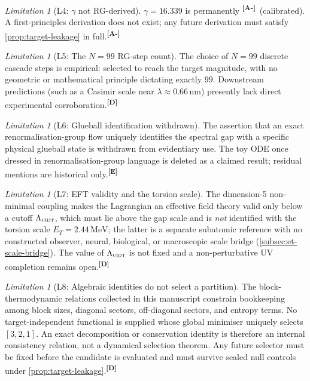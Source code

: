\documentclass[12pt,a4paper,twoside]{article}
\theoremstyle{plain}
\theoremstyle{definition}
\theoremstyle{remark}
\newtheorem{limitation}[theorem]{Limitation}
\newcommand{\UIDT}{\textsc{uidt}} %
\newcommand{\MeV}{\,\mathrm{MeV}}
\newcommand{\catmark}[1]{\textsuperscript{\textsf{\textbf{[#1]}}}}
\newcommand{\GammaGeom}{16.339} %
\newcommand{\ETorsion}{2.44\MeV} %
\begin{document}
\begin{limitation}[L4: $\gamma$ not RG-derived]
\label{lim:L4}
$\gamma = \GammaGeom$ is permanently \catmark{A-}\ (calibrated). A
first-principles derivation does not exist; any future derivation must
satisfy \cref{prop:target-leakage} in full.\catmark{A-}
\end{limitation}

\begin{limitation}[L5: The $N=99$ RG-step count]
\label{lim:L5}
The choice of $N=99$ discrete cascade steps is empirical: selected to
reach the target magnitude, with no geometric or mathematical principle
dictating exactly $99$. Downstream predictions (such as a Casimir scale
near $\lambda \approx 0.66\,\mathrm{nm}$) presently lack direct
experimental corroboration.\catmark{D}
\end{limitation}

\begin{limitation}[L6: Glueball identification withdrawn]
\label{lim:L6}
The assertion that an exact renormalisation-group flow uniquely
identifies the spectral gap with a specific physical glueball state is
withdrawn from evidentiary use. The toy ODE once dressed in
renormalisation-group language is deleted as a claimed result; residual
mentions are historical only.\catmark{E}
\end{limitation}

\begin{limitation}[L7: EFT validity and the torsion scale]
\label{lim:L7}
The dimension-5 non-minimal coupling makes the Lagrangian an effective
field theory valid only below a cutoff $\Lambda_{\UIDT}$, which must lie
above the gap scale and is \emph{not} identified with the torsion scale
$E_T = \ETorsion$; the latter is a separate subatomic reference with no
constructed observer, neural, biological, or macroscopic scale bridge
(\cref{subsec:et-scale-bridge}). The value of $\Lambda_{\UIDT}$
is not fixed and a non-perturbative UV completion remains
open.\catmark{D}
\end{limitation}

\begin{limitation}[L8: Algebraic identities do not select a partition]
\label{lim:L8}
The block-thermodynamic relations collected in this manuscript constrain
bookkeeping among block sizes, diagonal sectors, off-diagonal sectors,
and entropy terms. No target-independent functional is supplied whose
global minimiser uniquely selects $[3,2,1]$. An exact decomposition or
conservation identity is therefore an internal consistency relation, not
a dynamical selection theorem. Any future selector must be fixed before
the candidate is evaluated and must survive sealed null controls under
\cref{prop:target-leakage}.\catmark{D}
\end{limitation}
\end{document}
